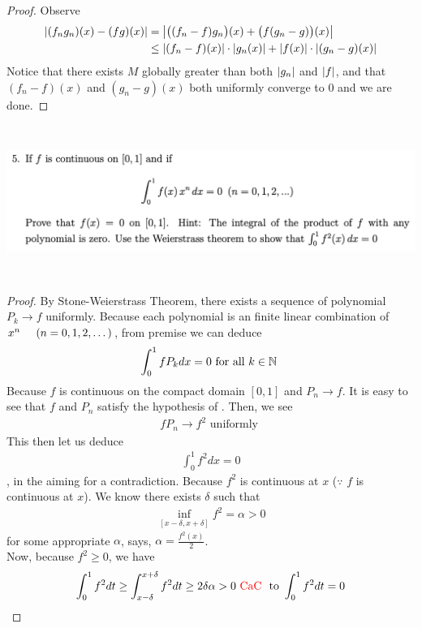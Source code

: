 \documentclass{report}
\begin{document}
\begin{proof}
Observe 
\begin{align*}
  \left|(f_ng_n)(x)-(fg)(x)\right|&=\left|\big((f_n-f)g_n \big)(x)+\big(f(g_n-g) \big)(x)\right|\\
  &\leq \left|(f_n-f)(x)\right|\cdot \left|g_n(x)\right|+\left|f(x)\right|\cdot \left|(g_n-g)(x)\right|
\end{align*}
Notice that there exists $M$ globally greater than both $\left|g_n\right|$ and $\left|f\right|$, and that $(f_n-f)(x)$ and $(g_n-g)(x)$ both uniformly converge to $0$ and we are done.
\end{proof}
\begin{question}{}{}
\includegraphics[height=5cm,width=18cm]{HW1.3}
\end{question}
\begin{proof}
By Stone-Weierstrass Theorem, there exists a sequence of polynomial $P_k \to f$ uniformly. Because each polynomial is an finite linear combination of $x^n\hspace{0.5cm}(n=0,1,2,\dots)$, from premise we can deduce
\begin{align*}
\int_0^1 f P_kdx=0\text{ for all $k\in\mathbb{N}$ }
\end{align*}
Because $f$ is continuous on the compact domain $[0,1]$ and $P_n \to f$. It is easy to see that $f$ and  $P_n$ satisfy the hypothesis of . Then, we see 
\begin{align*}
fP_n \to f^2\text{ uniformly }
\end{align*}
This then let us deduce 
\begin{align*}
\int_0^1 f^2 dx=0
\end{align*}
, in the aiming for a contradiction. Because $f^2$ is continuous at $x$ ($\because$  $f$ is continuous at $x$). We know there exists  $\delta$ such that 
\begin{align*}
\inf_{[x-\delta,x+\delta]}f^2=\alpha >0
\end{align*}
for some appropriate $\alpha $, says, $\alpha =\frac{f^2(x)}{2}$.\\

Now, because $f^2\geq 0$, we have 
\begin{align*}
  \int_0^1 f^2dt\geq \int_{x-\delta}^{x+\delta}f^2dt\geq 2\delta \alpha >0 \text{ \textcolor{red}{CaC} }\text{ to }\int_0^1 f^2dt=0
\end{align*}
\end{proof}
\end{document}
